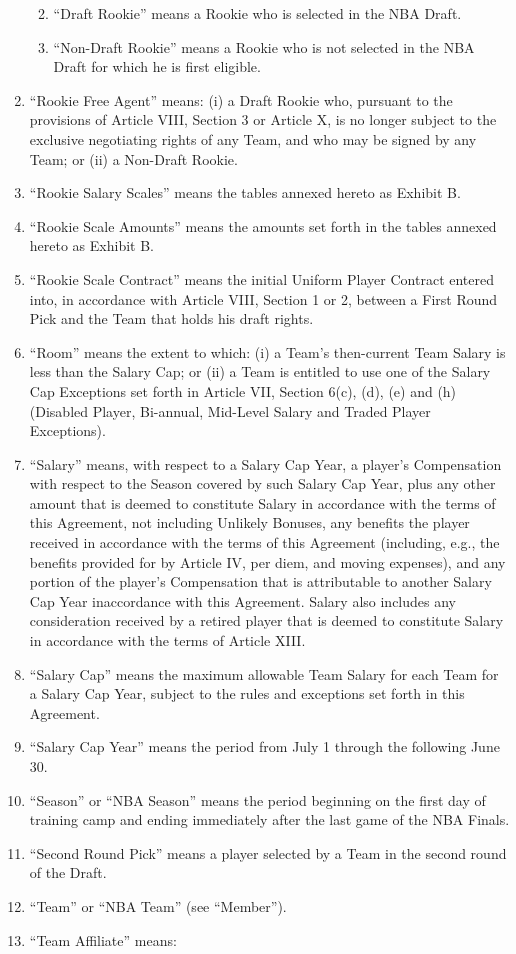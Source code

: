 \documentclass[
]{book}
\providecommand{\tightlist}{%
  \setlength{\itemsep}{0pt}\setlength{\parskip}{0pt}}
\begin{document}
\begin{enumerate}
  \begin{enumerate}
  \def\labelenumii{(\roman{enumii})}
  \tightlist
  \item
    ``Draft Rookie'' means a Rookie who is selected in the NBA Draft.
  \item
    ``Non-Draft Rookie'' means a Rookie who is not selected in the NBA Draft for which he is first eligible.
  \end{enumerate}
\item
  ``Rookie Free Agent'' means: (i) a Draft Rookie who, pursuant to the provisions of Article VIII, Section 3 or Article X, is no longer subject to the exclusive negotiating rights of any Team, and who may be signed by any Team; or (ii) a Non-Draft Rookie.
\item
  ``Rookie Salary Scales'' means the tables annexed hereto as Exhibit B.
\item
  ``Rookie Scale Amounts'' means the amounts set forth in the tables annexed hereto as Exhibit B.
\item
  ``Rookie Scale Contract'' means the initial Uniform Player Contract entered into, in accordance with Article VIII, Section 1 or 2, between a First Round Pick and the Team that holds his draft rights.
\item
  ``Room'' means the extent to which: (i) a Team's then-current Team Salary is less than the Salary Cap; or (ii) a Team is entitled to use one of the Salary Cap Exceptions set forth in Article VII, Section 6(c), (d), (e) and (h) (Disabled Player, Bi-annual, Mid-Level Salary and Traded Player Exceptions).
\item
  ``Salary'' means, with respect to a Salary Cap Year, a player's Compensation with respect to the Season covered by such Salary Cap Year, plus any other amount that is deemed to constitute Salary in accordance with the terms of this Agreement, not including Unlikely Bonuses, any benefits the player received in accordance with the terms of this Agreement (including, e.g., the benefits provided for by Article IV, per diem, and moving expenses), and any portion of the player's Compensation that is attributable to another Salary Cap Year inaccordance with this Agreement. Salary also includes any consideration received by a retired player that is deemed to constitute Salary in accordance with the terms of Article XIII.
\item
  ``Salary Cap'' means the maximum allowable Team Salary for each Team for a Salary Cap Year, subject to the rules and exceptions set forth in this Agreement.
\item
  ``Salary Cap Year'' means the period from July 1 through the following June 30.
\item
  ``Season'' or ``NBA Season'' means the period beginning on the first day of training camp and ending immediately after the last game of the NBA Finals.
\item
  ``Second Round Pick'' means a player selected by a Team in the second round of the Draft.
\item
  ``Team'' or ``NBA Team'' (see ``Member'').
\item
  ``Team Affiliate'' means:


\end{enumerate}
\end{document}
